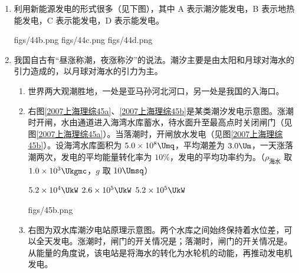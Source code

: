 \documentclass[\gkver]{gaokaozhenti}
\begin{document}
\begin{enumerate}
①昼夜温差大　　②宇宙射线较弱　　③高低起伏大　　④重力加速度小

{①②④}
{①③④}
{②③④}


\item
利用新能源发电的形式很多（见下图），其中 A 表示潮汐能发电，B 表示地热能发电，C 表示能发电，D 表示能发电。

{figs/44b.png}
{figs/44c.png}
{figs/44d.png}


\item
我国自古有“昼涨称潮，夜涨称汐”的说法。潮汐主要是由太阳和月球对海水的引力造成的，以月球对海水的引力为主。

\begin{enumerate}
	\item
	世界两大观潮胜地，一处是亚马孙河北河口，另一处是我国的入海口。

	\item
	右图\ref{2007上海理综45a}、\ref{2007上海理综45b}是某类潮汐发电示意图。涨潮时开闸，水由通道进入海湾水库蓄水，待水面升至最高点时关闭闸门（见图\ref{2007上海理综45a}）。当落潮时，开闸放水发电（见图\ref{2007上海理综45b}）。设海湾水库面积为 $5.0\times10^{8}\Umq$，平均潮差为 $3.0\Um$，一天涨落潮两次，发电的平均能量转化率为 $10\%$，发电的平均功率约为。（$\rho_{\text{海水}}$ 取 $1.0\times10^{3}\Ukgmc$，$g$ 取 $10\Umsq$）

	{$5.2\times10^{4}\UkW$}
	{$2.6\times10^{5}\UkW$}
	{$5.2\times10^{5}\UkW$}

	{figs/45b.png}

	\item
	右图为双水库潮汐电站原理示意图。两个水库之间始终保持着水位差，可以全天发电。涨潮时，闸门的开关情况是；落潮时，闸门的开关情况是。从能量的角度说，该电站是将海水的转化为水轮机的动能，再推动发电机发电。


\end{enumerate}
\end{enumerate}
\end{document}
